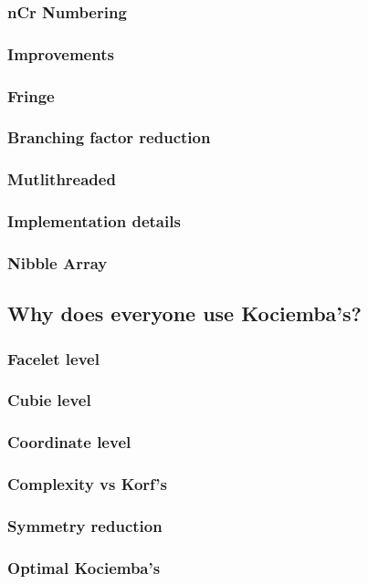 \documentclass[titlepage]{report}[12pt]
\begin{document}
\subsubsection{nCr Numbering}
\subsubsection{Improvements}
\subsubsection{Fringe}
\subsubsection{Branching factor reduction}
\subsubsection{Mutlithreaded}
\subsubsection{Implementation details}
\subsubsection{Nibble Array}

\subsection{Why does everyone use Kociemba's?}
\subsubsection{Facelet level}
\subsubsection{Cubie level}
\subsubsection{Coordinate level}
\subsubsection{Complexity vs Korf's}
\subsubsection{Symmetry reduction}
\subsubsection{Optimal Kociemba's}
\end{document}
